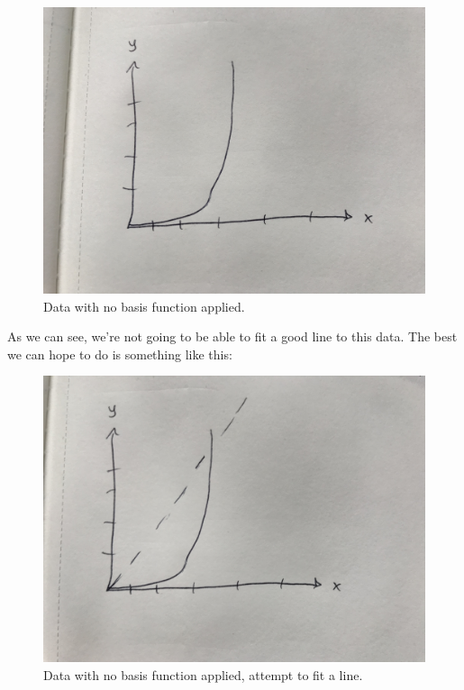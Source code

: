 \begin{figure}[H]
    \centering
    \includegraphics[width=0.5\paperwidth]{../LinearRegression/fig/lin_reg_no_basis_fn.jpg}
    \caption{Data with no basis function applied.}
    \label{fig:lin-reg-no-basis-fn}
\end{figure}

As we can see, we're not going to be able to fit a good line to this data. The best we can hope to do is something like this:

\begin{figure}[H]
    \centering
    \includegraphics[width=0.5\paperwidth]{../LinearRegression/fig/lin_reg_no_basis_fn_fitted.jpg}
    \caption{Data with no basis function applied, attempt to fit a line.}
    \label{fig:lin-reg-no-basis-fn-fitted}
\end{figure}

